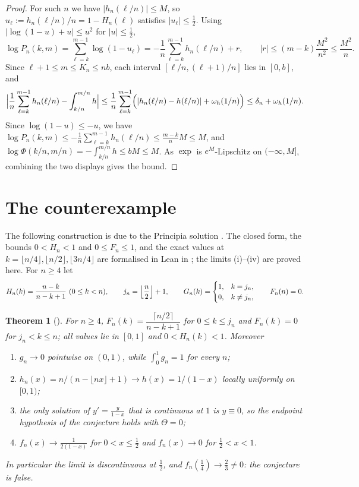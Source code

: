\documentclass[11pt]{article}
\newtheorem{theorem}{Theorem}
\theoremstyle{definition}
\theoremstyle{remark}
\newcommand{\1}{\mathbf{1}}
\newcommand{\fl}[1]{\lfloor #1\rfloor}
\begin{document}
\begin{proof}
For such $n$ we have $|h_n(\ell/n)|\le M$, so $u_\ell:=h_n(\ell/n)/n=1-H_n(\ell)$ satisfies
$|u_\ell|\le\tfrac12$. Using $|\log(1-u)+u|\le u^2$ for $|u|\le\tfrac12$,
\[
\log P_n(k,m)=\sum_{\ell=k}^{m-1}\log(1-u_\ell)=-\frac1n\sum_{\ell=k}^{m-1}h_n(\ell/n)+r,
\qquad |r|\le (m-k)\frac{M^2}{n^2}\le\frac{M^2}{n}.
\]
Since $\ell+1\le m\le K_n\le nb$, each interval $[\ell/n,(\ell+1)/n]$ lies in $[0,b]$, and
\[
\Bigl|\frac1n\sum_{\ell=k}^{m-1}h_n(\ell/n)-\int_{k/n}^{m/n}h\Bigr|
\le\frac1n\sum_{\ell=k}^{m-1}\Bigl(|h_n(\ell/n)-h(\ell/n)|+\omega_h(1/n)\Bigr)\le\delta_n+\omega_h(1/n).
\]
Since $\log(1-u)\le-u$, we have $\log P_n(k,m)\le-\frac1n\sum_{\ell=k}^{m-1}h_n(\ell/n)\le
\frac{m-k}{n}M\le M$, and $\log\Phi(k/n,m/n)=-\int_{k/n}^{m/n}h\le bM\le M$. As $\exp$ is
$e^{M}$-Lipschitz on $(-\infty,M]$, combining the two displays gives the bound.
\end{proof}

\section{The counterexample}\label{sec:counterexample}

The following construction is due to the Principia solution \cite{Pri26}. The closed form, the
bounds $0<H_n<1$ and $0\le F_n\le1$, and the exact values at $k=\fl{n/4},\fl{n/2},\fl{3n/4}$ are
formalised in Lean in \cite{PriLean}; the limits (i)--(iv) are proved here. For $n\ge4$ let
\[
H_n(k)=\frac{n-k}{n-k+1}\ (0\le k<n),\qquad j_n=\Bigl\lfloor\frac n2\Bigr\rfloor+1,\qquad
G_n(k)=\begin{cases}1,&k=j_n,\\0,&k\ne j_n,\end{cases}\qquad F_n(n)=0.
\]

\begin{theorem}[\cite{Pri26}]\label{thm:ce}
For $n\ge4$, $F_n(k)=\dfrac{\lceil n/2\rceil}{n-k+1}$ for $0\le k\le j_n$ and $F_n(k)=0$ for
$j_n<k\le n$; all values lie in $[0,1]$ and $0<H_n(k)<1$. Moreover
\begin{enumerate}[label=\textup{(\roman*)},itemsep=1pt]
\item $g_n\to0$ pointwise on $(0,1)$, while $\int_0^1g_n=1$ for every $n$;
\item $h_n(x)=n/(n-\fl{nx}+1)\to h(x)=1/(1-x)$ locally uniformly on $[0,1)$;
\item the only solution of $y'=\frac{y}{1-x}$ that is continuous at $1$ is $y\equiv0$, so the
endpoint hypothesis of the conjecture holds with $\Theta=0$;
\item $f_n(x)\to\frac{1}{2(1-x)}$ for $0<x\le\frac12$ and $f_n(x)\to0$ for $\frac12<x<1$.
\end{enumerate}
In particular the limit is discontinuous at $\tfrac12$, and $f_n(\tfrac14)\to\tfrac23\neq0$:
the conjecture is false.
\end{theorem}
\end{document}
